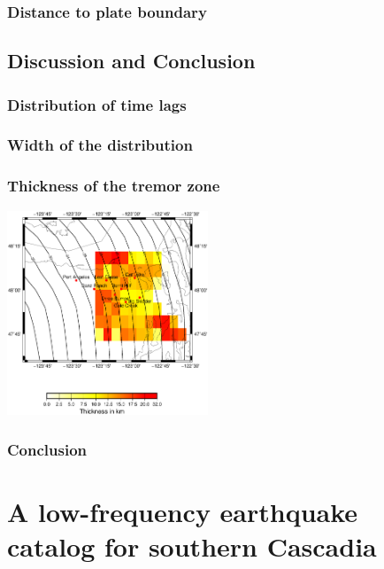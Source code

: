 \documentclass{beamer}
\begin{document}
	\begin{frame}
		\frametitle{Distance to plate boundary}
	\end{frame}

	\subsection{Discussion and Conclusion}

	\begin{frame}
		\frametitle{Distribution of time lags}
	\end{frame}

	\begin{frame}
		\frametitle{Width of the distribution}
	\end{frame}

	\begin{frame}
		\frametitle{Thickness of the tremor zone}
		\begin{center}
			\includegraphics[width=6cm, trim={1cm 3cm 2cm 6cm}, clip]{other/thickness_PWS_PWS.eps}
		\end{center}
	\end{frame}

	\begin{frame}
		\frametitle{Conclusion}
	\end{frame}


	\section{A low-frequency earthquake catalog for southern Cascadia}
\end{document}
